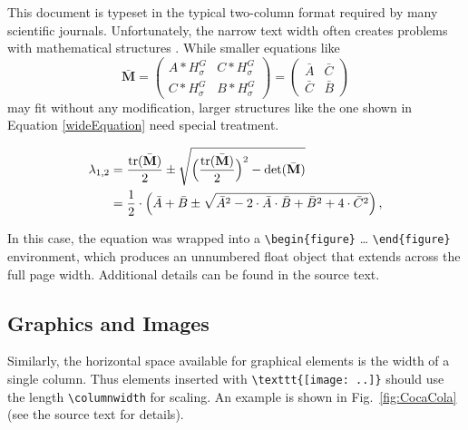 \documentclass[english,twocolumn,smartquotes]{hgbarticle}
\begin{document}
This document is typeset in the typical two-column format required by many
scientific journals. Unfortunately, the narrow text width often creates
problems with mathematical structures \cite{Voss2014}. While smaller
equations like
%
\begin{equation}
\bar{\mathbf{M}} =  
\begin{pmatrix}
	A \ast H^{G}_{\sigma}   & C \ast H^{G}_{\sigma} \\
	C \ast H^{G}_{\sigma}   & B \ast H^{G}_{\sigma} 
\end{pmatrix}
=
\begin{pmatrix}
	\bar{A}   & \bar{C} \\
	\bar{C}   & \bar{B} 
\end{pmatrix}
\end{equation}
%
may fit without any modification, larger structures like the one shown in
Equation \ref{wideEquation} need special treatment.
%
\begin{figure}[t]
	\begin{equation}
		\begin{split}
			\lambda_{1,2}
			&= \frac{\mathrm{tr}(\bar{\mathbf{M}})}{2} \pm \sqrt{\Bigl
			(\frac{\mathrm{tr}(\bar{\mathbf{M}})}{2}\Bigr)^2
			- \mathrm{det}(\bar{\mathbf{M}})}  \\
			&= \frac{1}{2} \cdot \left( \bar{A} + \bar{B} \pm \sqrt{\bar{A}^2 -
			2 \cdot \bar{A} \cdot \bar{B} + \bar{B}^2 + 4 \cdot \bar{C}^2}
			\right)
			,
		\end{split}
		\label{wideEquation}
	\end{equation}
\end{figure}
%
In this case, the equation was wrapped into a \verb!\begin{figure}! \ldots
\verb!\end{figure}! environment, which produces an unnumbered float object
that extends across the full page width. Additional details can be found in
the source text.

\subsection{Graphics and Images}

Similarly, the horizontal space available for graphical elements is the width
of a single column. Thus elements inserted with \verb!\texttt{[image: ..]}! 
should use the length \verb!\columnwidth! for scaling. An example is shown in
Fig.~\ref{fig:CocaCola} (see the source text for details).
\end{document}
